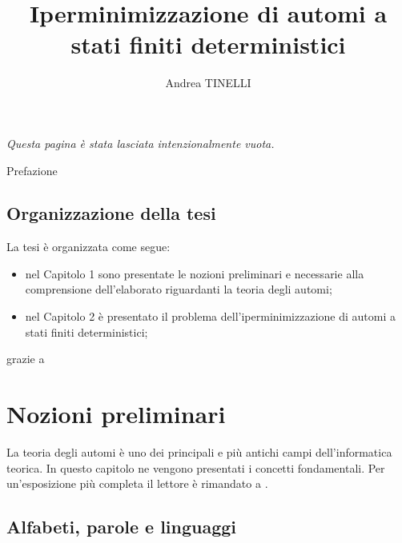 \documentclass[a4paper,12pt,twoside,openright]{report}
\begin{document}


\title{Iperminimizzazione di automi a stati finiti deterministici}
\author{Andrea TINELLI}



\beforepreface
\prefacesection{}
{\hfill {\sl Questa pagina è stata lasciata intenzionalmente vuota.}}


Prefazione


\section{Organizzazione della tesi}
\label{organizzazione}
La tesi \`e organizzata come segue:
\begin{itemize}
  \item nel Capitolo 1 sono presentate le nozioni preliminari e necessarie alla comprensione dell'elaborato riguardanti la teoria degli automi;
  \item nel Capitolo 2 è presentato il problema dell'iperminimizzazione di automi a stati finiti deterministici;
\end{itemize}


grazie a 
\afterpreface


\chapter{Nozioni preliminari}
\label{cap1}

La teoria degli automi è uno dei principali e più antichi campi dell'informatica teorica. In questo capitolo
ne vengono presentati i concetti fondamentali. Per un'esposizione più completa il lettore è rimandato a \cite{HMU06}.

\section{Alfabeti, parole e linguaggi}
\end{document}
